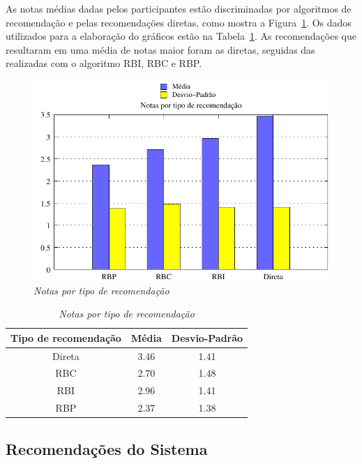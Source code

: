  As notas médias dadas pelos participantes estão discriminadas por algoritmos de recomendação e pelas recomendações diretas, como mostra a Figura~\ref{fig:notas_medias}. Os dados utilizados para a elaboração do gráficos estão na Tabela~\ref{table:notas_medias}. As recomendações que resultaram em uma média de notas maior foram as diretas, seguidas das realizadas com o algoritmo RBI, RBC e RBP.
 
\begin{figure}
    \centering
    \includegraphics[width=\textwidth]{imagens/grafico_notas_medias}
    \caption{\it Notas por tipo de recomendação}
    \label{fig:notas_medias}
\end{figure}

\begin{table}
\centering
\begin{tabular}{c c c}
    \hline \hline
    \textbf{Tipo de recomendação} & \textbf{Média}& \textbf{Desvio-Padrão} \\
\hline 
Direta & 3.46 & 1.41 \\
\hline 
RBC & 2.70 & 1.48 \\
\hline 
RBI & 2.96 & 1.41 \\
\hline 
RBP & 2.37 & 1.38 \\
\hline        
\end{tabular}
\caption{\it Notas por tipo de recomendação}
\label{table:notas_medias}
\end{table}

\subsection{Recomendações do Sistema}

